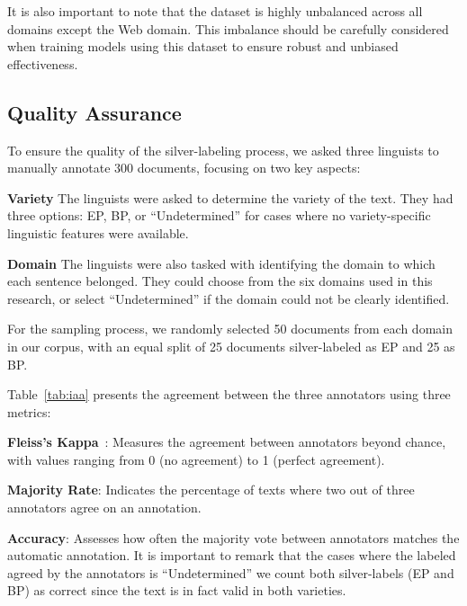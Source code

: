 It is also important to note that the dataset is highly unbalanced across all domains except the Web domain. This imbalance should be carefully considered when training models using this dataset to ensure robust and unbiased effectiveness.


\subsection{Quality Assurance}

To ensure the quality of the silver-labeling process, we asked three linguists to manually annotate 300 documents, focusing on two key aspects:

\begin{description}

\item \textbf{Variety} The linguists were asked to determine the variety of the text. They had three options: EP, BP, or ``Undetermined'' for cases where no variety-specific linguistic features were available.

\item \textbf{Domain} The linguists were also tasked with identifying the domain to which each sentence belonged. They could choose from the six domains used in this research, or select ``Undetermined'' if the domain could not be clearly identified.

\end{description}

For the sampling process, we randomly selected 50 documents from each domain in our corpus, with an equal split of 25 documents silver-labeled as EP and 25 as BP. 

Table~\ref{tab:iaa} presents the agreement between the three annotators using three metrics:

\begin{description}

\item \textbf{Fleiss's Kappa}~\cite{fleiss1971measuring}: Measures the agreement between annotators beyond chance, with values ranging from 0 (no agreement) to 1 (perfect agreement).

\item \textbf{Majority Rate}: Indicates the percentage of texts where two out of three annotators agree on an annotation.

\item \textbf{Accuracy}: Assesses how often the majority vote between annotators matches the automatic annotation. It is important to remark that the cases where the labeled agreed by the annotators is ``Undetermined'' we count both silver-labels (EP and BP) as correct since the text is in fact valid in both varieties.

\end{description}


